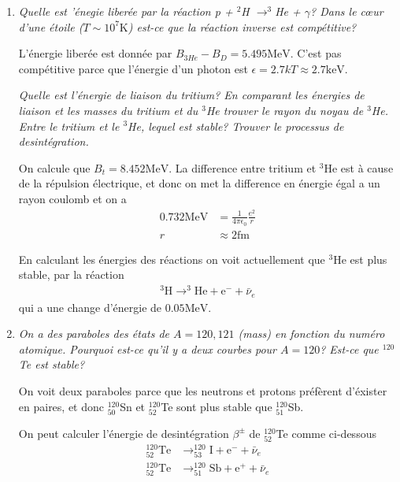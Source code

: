 \documentclass[10pt]{report}
\begin{document}
\begin{enumerate}[1.]
    \item \emph{Quelle est '\'enegie liber\'ee par la r\'eaction p + $^2$H $\to ^3$He + $\gamma$? Dans le c\oe ur d'une \'etoile ($T \sim 10^7\mathrm{K}$) est-ce que la r\'eaction inverse est comp\'etitive?}

        L'\'energie liber\'ee est donn\'ee par $B_{3He} - B_D = 5.495\mathrm{MeV}$. C'est pas comp\'etitive parce que l'\'energie d'un photon est $\epsilon = 2.7kT \approx 2.7\mathrm{keV}$.

        \emph{Quelle est l'\'energie de liaison du tritium? En comparant les \'energies de liaison et les masses du tritium et du $^3$He trouver le rayon du noyau de $^3$He. Entre le tritium et le $^3$He, lequel est stable? Trouver le processus de desint\'egration.}

        On calcule que $B_t = 8.452\mathrm{MeV}$. La difference entre tritium et $^3$He est \`a cause de la r\'epulsion \'electrique, et donc on met la difference en \'energie \'egal a un rayon coulomb et on a
        \begin{align}
            0.732\mathrm{MeV} &= \frac{1}{4\pi\epsilon_0}\frac{e^2}{r}\\
            r &\approx 2\mathrm{fm}
        \end{align}

        En calculant les \'energies des r\'eactions on voit actuellement que $^3$He est plus stable, par la r\'eaction
        \begin{align}
            ^3\mathrm{H} \to ^3\mathrm{He} + \mathrm{e}^- + \bar{\nu}_e
        \end{align}
        qui a une change d'\'energie de $0.05\mathrm{MeV}$. 
    \item \emph{On a des paraboles des \'etats de $A=120,121$ (mass) en fonction du num\'ero atomique. Pourquoi est-ce qu'il y a deux courbes pour $A = 120$? Est-ce que $^{120}$Te est stable?}

        On voit deux paraboles parce que les neutrons et protons pr\'ef\`erent d'\'exister en paires, et donc $_{50}^{120}$Sn et $_{52}^{120}$Te sont plus stable que $_{51}^{120}$Sb.

        On peut calculer l'\'energie de desint\'egration $\beta^{\pm}$ de $_{52}^{120}$Te comme ci-dessous
        \begin{align}
            _{52}^{120}\mathrm{Te} &\to _{53}^{120}\mathrm{I} + \mathrm{e}^{-} + \bar{\nu}_e\\
            _{52}^{120}\mathrm{Te} &\to _{51}^{120}\mathrm{Sb} + \mathrm{e}^{+} + \bar{\nu}_e
        \end{align}


\end{enumerate}
\end{document}
